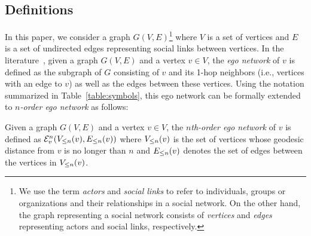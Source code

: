 \subsection{Definitions}\label{subsec:x-egoDefinition}
In this paper, we consider a graph $G(V, E)$\footnote{We use the term {\em actors} and {\em social links} to refer to individuals, groups or organizations and their relationships in a social network. On the other hand, the graph representing a social network consists of {\em vertices} and {\em edges} representing actors and social links, respectively.} where $V$ is a set of vertices and $E$ is a set of undirected edges representing social links between vertices.
In the literature~\cite{egocentric, everett, ICCN:lbcdna, SIMBET}, given a graph $G(V, E)$ and a vertex $v \in V$, the {\em ego network} of $v$ is defined as the subgraph of $G$ consisting of $v$ and its 1-hop neighbors (i.e., vertices with an edge to $v$) as well as the edges between these vertices.
Using the notation summarized in Table~\ref{table:symbols}, this ego network can be formally extended to \emph{$n$-order ego network} as follows:

\begin{definition}\label{def:multi-order-ego-network}
Given a graph $G(V, E)$ and a vertex $v \in V$, the \emph{$n$th-order ego network} of $v$ is defined as $\ENN{v}{n} (\LV{v}{n}, \LE{v}{n})$ where $\LV{v}{n}$ is the set of vertices whose geodesic distance from $v$ is no longer than $n$ and $\LE{v}{n}$ denotes the set of edges between the vertices in $\LV{v}{n}$.
\end{definition}

